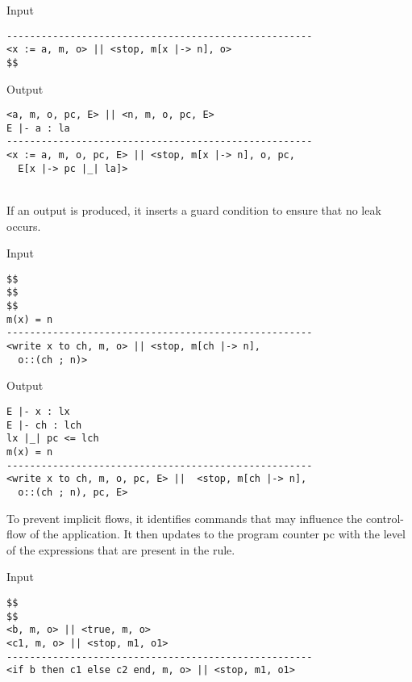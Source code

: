\documentclass[final]{beamer}
\newlength{\twocolwid}
\begin{document}
\begin{frame}[fragile]
\begin{columns}[t]
\begin{column}{\twocolwid}
\begin{minipage}[t]{0.49\linewidth}
\begin{alertblock}{Input}
\begin{lstlisting}
-----------------------------------------------------
<x := a, m, o> || <stop, m[x |-> n], o>
$$
\end{lstlisting}        
\end{alertblock}
\end{minipage}
\hfill%
\begin{minipage}[t]{0.49\linewidth}
\begin{alertblock}{Output}
\begin{lstlisting}
<a, m, o, pc, E> || <n, m, o, pc, E>
E |- a : la
-----------------------------------------------------
<x := a, m, o, pc, E> || <stop, m[x |-> n], o, pc, 
  E[x |-> pc |_| la]>
\end{lstlisting}
\end{alertblock}
\end{minipage}\\
\color{black}
If an output is produced, it inserts a guard condition to ensure that no leak occurs.\\
\vspace{-1cm}
\noindent
\begin{minipage}[t]{0.49\linewidth}
\begin{alertblock}{Input}
\begin{lstlisting}
$$
$$
$$
m(x) = n
-----------------------------------------------------
<write x to ch, m, o> || <stop, m[ch |-> n], 
  o::(ch ; n)>
\end{lstlisting}        
\end{alertblock}
\end{minipage}
\hfill%
\begin{minipage}[t]{0.49\linewidth}
\begin{alertblock}{Output}
\begin{lstlisting}
E |- x : lx
E |- ch : lch
lx |_| pc <= lch
m(x) = n
-----------------------------------------------------
<write x to ch, m, o, pc, E> ||  <stop, m[ch |-> n], 
  o::(ch ; n), pc, E>
\end{lstlisting}
\end{alertblock}
\end{minipage}

\color{black}
To prevent implicit flows, it identifies commands that may influence the control-flow of the application. It then updates to the program counter pc with the level of the expressions that are present in the rule.\\
\vspace{-1cm}
\noindent
\begin{minipage}[t]{0.49\linewidth}
\begin{alertblock}{Input}
\begin{lstlisting}
$$
$$
<b, m, o> || <true, m, o>
<c1, m, o> || <stop, m1, o1>
-----------------------------------------------------
<if b then c1 else c2 end, m, o> || <stop, m1, o1>





\end{lstlisting}
\end{alertblock}
\end{minipage}
\end{column}
\end{columns}
\end{frame}
\end{document}
